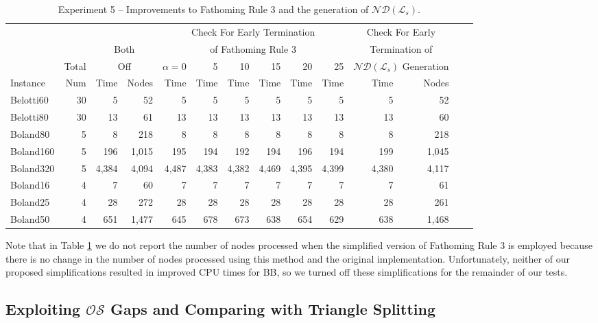 \documentclass[11.5pt]{article}
\renewcommand{\L}{\mathcal{L}}
\newcommand{\OS}{\mathcal{OS}}
\newcommand{\nd}[1]{\mathcal{ND}(#1)}
\begin{document}
 \begin{table}[h!]
\centering
\caption{Experiment 5 -- Improvements to Fathoming Rule 3 and the generation of $\nd{\L_s}$.}\label{table_improvements}
\begin{tabular}{l|r|rr|rrrrrr|rrrr}
\toprule
 &  & \multicolumn{2}{c}{} & \multicolumn{6}{c}{Check For Early Termination} & \multicolumn{2}{c}{Check For Early}\\ 
 &  & \multicolumn{2}{c}{Both} & \multicolumn{6}{c}{of Fathoming Rule 3} & \multicolumn{2}{c}{Termination of}\\ 
 \cmidrule(r){5-10}
  & Total & \multicolumn{2}{c}{Off} &$\alpha =$\hfill 0 & 5 & 10 & 15 & 20 & 25 & \multicolumn{2}{c}{$\nd{\L_s}$ Generation}\\
\cmidrule(r){3-4}
\cmidrule(r){5-10}
\cmidrule(r){11-12}
Instance & Num & Time & Nodes & Time & Time & Time & Time & Time & Time & Time &  Nodes  \\ 
\midrule
Belotti60 & 30 & 5 & 52 & 5 & 5 & 5 & 5 & 5 & 5 & 5 & 52 \\
Belotti80 & 30 & 13 & 61 & 13 & 13 & 13 & 13 & 13 & 13 & 13 & 60 \\
\midrule
Boland80 & 5 & 8 & 218 & 8 & 8 & 8 & 8 & 8 & 8 & 8 & 218 \\
Boland160 & 5 & 196 & 1,015 & 195 & 194 & 192 & 194 & 196 & 194 & 199 & 1,045 \\
Boland320 & 5 & 4,384 & 4,094 & 4,487 & 4,383 & 4,382 & 4,469 & 4,395 & 4,399 & 4,380 & 4,117 \\
Boland16 & 4 & 7 & 60 & 7 & 7 & 7 & 7 & 7 & 7 &7 & 61 \\
Boland25 & 4 & 28 & 272 & 28 & 28 & 28 & 28 & 28 & 28 & 28 & 261 \\
Boland50 & 4 & 651 & 1,477 & 645 & 678 & 673 & 638 & 654 & 629 & 638 & 1,468   \\
\bottomrule
\end{tabular}
\end{table}

Note that in Table \ref{table_improvements} we do not report the number of nodes processed when the simplified version of Fathoming Rule 3 is employed because there is no change in the number of nodes processed using this method and the original implementation. Unfortunately, neither of our proposed simplifications resulted in improved CPU times for BB, so we turned off these simplifications for the remainder of our tests.

\subsection{Exploiting $\OS$ Gaps and Comparing with Triangle Splitting}
\end{document}
